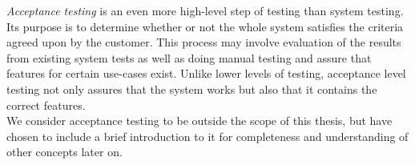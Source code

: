 
\emph{Acceptance testing} is an even more high-level step of testing than
system testing. Its purpose is to determine whether or not the
whole system satisfies the criteria agreed upon by the customer. This
process may involve evaluation of the results from existing system tests
as well as doing manual testing and assure that features for certain
use-cases exist. Unlike lower levels of testing, acceptance level
testing not only assures that the system works but also that it contains
the correct features. \cite{book:adp, wiki:acceptance}\\

We consider acceptance testing to be outside the scope of this thesis,
but have chosen to include a brief introduction to it for completeness
and understanding of other concepts later on.\\
